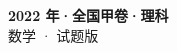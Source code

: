 \documentclass[zihao=-4, a4paper]{ctexart}
\begin{document}
\begin{center}
  {\Large\bfseries 2022 年·全国甲卷·理科}\\[4pt]
  {\large 数学 · 试题版}
\end{center}
\medskip
{}

\end{document}
